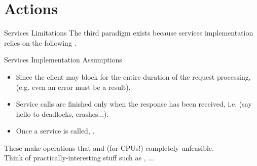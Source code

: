 
\section{Actions}
\graphicspath{{figs/section2/}}

\begin{frame}{Services Limitations}
The third paradigm exists because services implementation relies on the following .
\begin{alertblock}{Services Implementation Assumptions}
  \begin{itemize}
    \item Since the client may block for the entire duration of the request processing,  (e.g. even an error must be a result).
    \item Service calls are finished only when the response has been received, i.e.  (say hello to deadlocks, crashes...).
    \item Once a service is called, .
  \end{itemize}
\end{alertblock}
These make operations that  and  (for CPUs!) completely unfeasible.\\
Think of practically-interesting stuff such as , ...
\end{frame}


